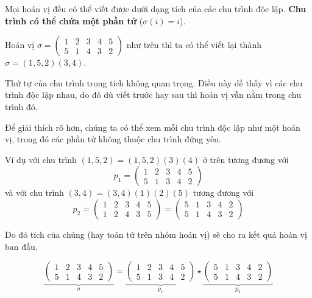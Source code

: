 \begin{remark}
    Mọi hoán vị đều có thể viết được dưới dạng tích của các chu trình độc lập. \textbf{Chu trình có thể chứa một phần tử} ($\sigma(i) = i$).
\end{remark}

\begin{example}
    Hoán vị $\sigma = \begin{pmatrix}
        1 & 2 & 3 & 4 & 5 \\ 5 & 1 & 4 & 3 & 2
    \end{pmatrix}$ như trên thì ta có thể viết lại thành $\sigma = (1, 5, 2)(3, 4)$.
\end{example}

\begin{remark}
    Thứ tự của chu trình trong tích không quan trọng. Điều này dễ thấy vì các chu trình độc lập nhau, do đó dù  viết trước hay sau thì hoán vị vẫn nằm trong chu trình đó.
\end{remark}

Để giải thích rõ hơn, chúng ta có thể xem mỗi chu trình độc lập như một hoán vị, trong đó các phần tử không thuộc chu trình đứng yên. 

Ví dụ với chu trình $(1, 5, 2) = (1, 5, 2)(3)(4)$
ở trên tương đương với \[p_1 = \begin{pmatrix}
    1 & 2 & 3 & 4 & 5 \\ 5 & 1 & 3 & 4 & 2
\end{pmatrix}\] và với chu trình $(3, 4) = (3, 4)(1)(2)(5)$ tương đương với
\[p_2 = \begin{pmatrix}
    1 & 2 & 3 & 4 & 5 \\ 1 & 2 & 4 & 3 & 5
\end{pmatrix} = \begin{pmatrix}
    5 & 1 & 3 & 4 & 2 \\ 5 & 1 & 4 & 3 & 2
\end{pmatrix}\]

Do đó tích của chúng (hay toán tử trên nhóm hoán vị) sẽ cho ra kết quả hoán vị ban đầu.

\[\underbrace{\begin{pmatrix}
    1 & 2 & 3 & 4 & 5 \\ 5 & 1 & 4 & 3 & 2
\end{pmatrix}}_{\sigma} = \underbrace{\begin{pmatrix}
    1 & 2 & 3 & 4 & 5 \\ 5 & 1 & 3 & 4 & 2
\end{pmatrix}}_{p_1} \star \underbrace{\begin{pmatrix}
    5 & 1 & 3 & 4 & 2 \\ 5 & 1 & 4 & 3 & 2 
\end{pmatrix}}_{p_2}\]

